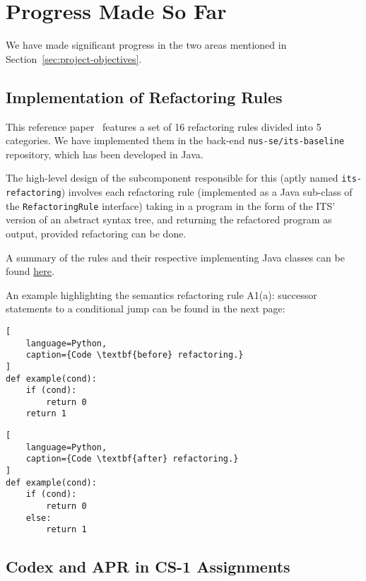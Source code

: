 \chapter{Progress Made So Far}
We have made significant progress in the two areas mentioned in Section~\ref{sec:project-objectives}.

\section{Implementation of Refactoring Rules}\label{sec:implementation-of-refactoring-rules}

This reference paper~\cite{hu2019re} features a set of 16 refactoring rules divided into 5 categories.
We have implemented them in the back-end
\texttt{nus-se/its-baseline} repository,
which has been developed in Java.

The high-level design of the subcomponent responsible for this (aptly named \texttt{its-refactoring})
involves each refactoring rule (implemented as a Java sub-class of the \texttt{RefactoringRule} interface)
taking in a program in the form of the ITS' version of an abstract syntax tree, and returning the
refactored program as output, provided refactoring can be done.

A summary of the rules and their respective implementing Java classes can be found
\href{https://docs.google.com/document/d/1MnEVEUaiQ1A2MWca_qPiktKZdP6hV-1CLTXcWwK6PyE/edit}{here}.

An example highlighting the semantics refactoring rule A1(a): successor statements to a
conditional jump can be found in the next page:

\pagebreak

\begin{multicols}{2}
\begin{lstlisting}[
    language=Python,
    caption={Code \textbf{before} refactoring.}
]
def example(cond):
    if (cond):
        return 0
    return 1
\end{lstlisting}

\columnbreak

\begin{lstlisting}[
    language=Python,
    caption={Code \textbf{after} refactoring.}
]
def example(cond):
    if (cond):
        return 0
    else:
        return 1
\end{lstlisting}
\end{multicols}

\section{Codex and APR in CS-1 Assignments}

